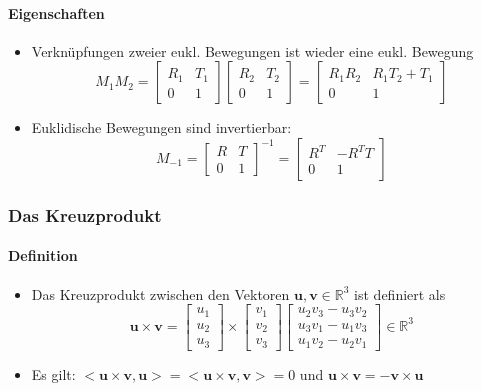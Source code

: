 \documentclass[12pt, a4paper, oneside]{article}
\begin{document}
\paragraph*{Eigenschaften}

\begin{itemize}
    \item Verknüpfungen zweier eukl. Bewegungen ist wieder eine eukl. Bewegung 
    $$M_1M_2 = \begin{bmatrix}
        R_1 & T_1 \\
        0 & 1
    \end{bmatrix}
    \begin{bmatrix}
        R_2 & T_2 \\
        0 & 1
    \end{bmatrix} = 
    \begin{bmatrix}
        R_1R_2 & R_1T_2+T_1 \\
        0 & 1
    \end{bmatrix}$$
    \item Euklidische Bewegungen sind invertierbar:
    $$M_{-1} = \begin{bmatrix}
        R & T \\
        0 & 1
    \end{bmatrix}^{-1} = 
    \begin{bmatrix}
        R^T & -R^TT \\
        0 & 1
    \end{bmatrix}
    $$
\end{itemize}

\subsubsection{Das Kreuzprodukt}

\paragraph*{Definition}

\begin{itemize}
    \item Das Kreuzprodukt zwischen den Vektoren $\mathbf{u, v}\in\mathbb{R}^3$ ist definiert als
    $$
    \mathbf{u}\times\mathbf{v} = \begin{bmatrix}
        u_1 \\ u_2 \\ u_3
    \end{bmatrix}\times
    \begin{bmatrix}
        v_1 \\ v_2 \\ v_3
    \end{bmatrix}
    \begin{bmatrix}
        u_2v_3-u_3v_2 \\
        u_3v_1-u_1v_3 \\
        u_1v_2-u_2v_1
    \end{bmatrix}\in\mathbb{R}^3
    $$
    \item Es gilt: $<\mathbf{u}\times\mathbf{v},\mathbf{u}> = <\mathbf{u}\times\mathbf{v},\mathbf{v}> = 0$
    und $\mathbf{u}\times\mathbf{v} = -\mathbf{v}\times\mathbf{u}$
\end{itemize}
\end{document}
